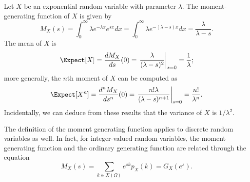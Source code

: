 \begin{example}
Let $X$ be an exponential random variable with parameter $\lambda$.
The moment-generating function of $X$ is given by
\begin{equation*}
M_X (s) = \int_0^{\infty} \lambda e^{-\lambda x} e^{sx} dx
= \int_0^{\infty} \lambda e^{-(\lambda-s) x} dx
= \frac{\lambda}{\lambda - s} .
\end{equation*}
The mean of $X$ is
\begin{equation*}
\Expect [X] = \frac{d M_X }{ds} (0)
= \left. \frac{\lambda}{(\lambda - s)^2} \right|_{s=0}
= \frac{1}{\lambda} ;
\end{equation*}
more generally, the $n$th moment of $X$ can be computed as
\begin{equation*}
\Expect [X^n] = \frac{d^n M_X }{ds^n} (0)
= \left. \frac{n! \lambda}{(\lambda - s)^{n+1}} \right|_{s=0}
= \frac{n!}{\lambda^n} .
\end{equation*}
Incidentally, we can deduce from these results that the variance of $X$ is $1/\lambda^2$.
\end{example}

The definition of the moment generating function applies to discrete random variables as well.
In fact, for integer-valued random variables, the moment generating function and the ordinary generating function are related through the equation  
\begin{equation*}
M_X (s) = \sum_{k \in X(\Omega)} e^{sk} p_X(k) = G_X (e^s) .
\end{equation*}

